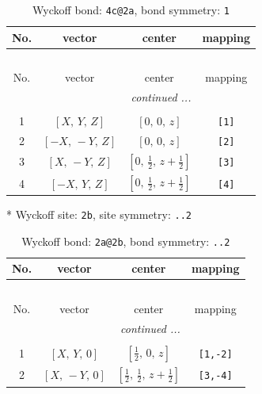 \documentclass[fleqn,8pt]{jsarticle}
\begin{document}
\renewcommand{\arraystretch}{1.2}
\begin{longtable}{cccc}
\caption{Wyckoff bond: {\tt 4c@2a}, bond symmetry: {\tt 1}}
 \\
 \hline \hline
No. & vector & center & mapping \\ \hline \endfirsthead

\multicolumn{3}{l}{\tablename\ \thetable{}} \\
 \hline \hline
No. & vector & center & mapping \\ \hline \endhead

 \hline \hline
\multicolumn{3}{r}{\footnotesize\it continued ...} \\ \endfoot

 \hline \hline
\multicolumn{3}{r}{} \\ \endlastfoot

1 & $\left[ X,\, Y,\, Z \right]$ & $\left[ 0,\, 0,\, z \right]$ & {\tt [1]} \\ \hline
2 & $\left[ - X,\, - Y,\, Z \right]$ & $\left[ 0,\, 0,\, z \right]$ & {\tt [2]} \\ \hline
3 & $\left[ X,\, - Y,\, Z \right]$ & $\left[ 0,\, \frac{1}{2},\, z + \frac{1}{2} \right]$ & {\tt [3]} \\ \hline
4 & $\left[ - X,\, Y,\, Z \right]$ & $\left[ 0,\, \frac{1}{2},\, z + \frac{1}{2} \right]$ & {\tt [4]} \\
\end{longtable}
* Wyckoff site: {\tt 2b}, site symmetry: {\tt ..2}
\renewcommand{\arraystretch}{1.2}
\begin{longtable}{cccc}
\caption{Wyckoff bond: {\tt 2a@2b}, bond symmetry: {\tt ..2}}
 \\
 \hline \hline
No. & vector & center & mapping \\ \hline \endfirsthead

\multicolumn{3}{l}{\tablename\ \thetable{}} \\
 \hline \hline
No. & vector & center & mapping \\ \hline \endhead

 \hline \hline
\multicolumn{3}{r}{\footnotesize\it continued ...} \\ \endfoot

 \hline \hline
\multicolumn{3}{r}{} \\ \endlastfoot

1 & $\left[ X,\, Y,\, 0 \right]$ & $\left[ \frac{1}{2},\, 0,\, z \right]$ & {\tt [1,-2]} \\ \hline
2 & $\left[ X,\, - Y,\, 0 \right]$ & $\left[ \frac{1}{2},\, \frac{1}{2},\, z + \frac{1}{2} \right]$ & {\tt [3,-4]} \\
\end{longtable}
\end{document}
